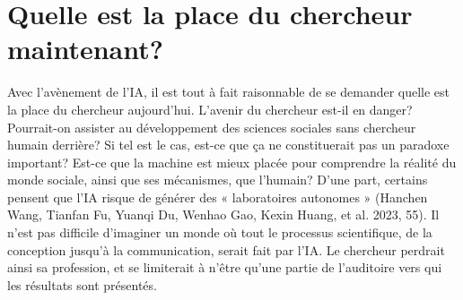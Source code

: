 \documentclass[
  letterpaper,
]{scrbook}
\begin{document}
\hypertarget{quelle-est-la-place-du-chercheur-maintenant}{%
\section{Quelle est la place du chercheur
maintenant?}\label{quelle-est-la-place-du-chercheur-maintenant}}

Avec l'avènement de l'IA, il est tout à fait raisonnable de se demander
quelle est la place du chercheur aujourd'hui. L'avenir du chercheur
est-il en danger? Pourrait-on assister au développement des sciences
sociales sans chercheur humain derrière? Si tel est le cas, est-ce que
ça ne constituerait pas un paradoxe important? Est-ce que la machine est
mieux placée pour comprendre la réalité du monde sociale, ainsi que ses
mécanismes, que l'humain? D'une part, certains pensent que l'IA risque
de générer des « laboratoires autonomes » (Hanchen Wang, Tianfan Fu,
Yuanqi Du, Wenhao Gao, Kexin Huang, et al. 2023, 55). Il n'est pas
difficile d'imaginer un monde où tout le processus scientifique, de la
conception jusqu'à la communication, serait fait par l'IA. Le chercheur
perdrait ainsi sa profession, et se limiterait à n'être qu'une partie de
l'auditoire vers qui les résultats sont présentés.
\end{document}
